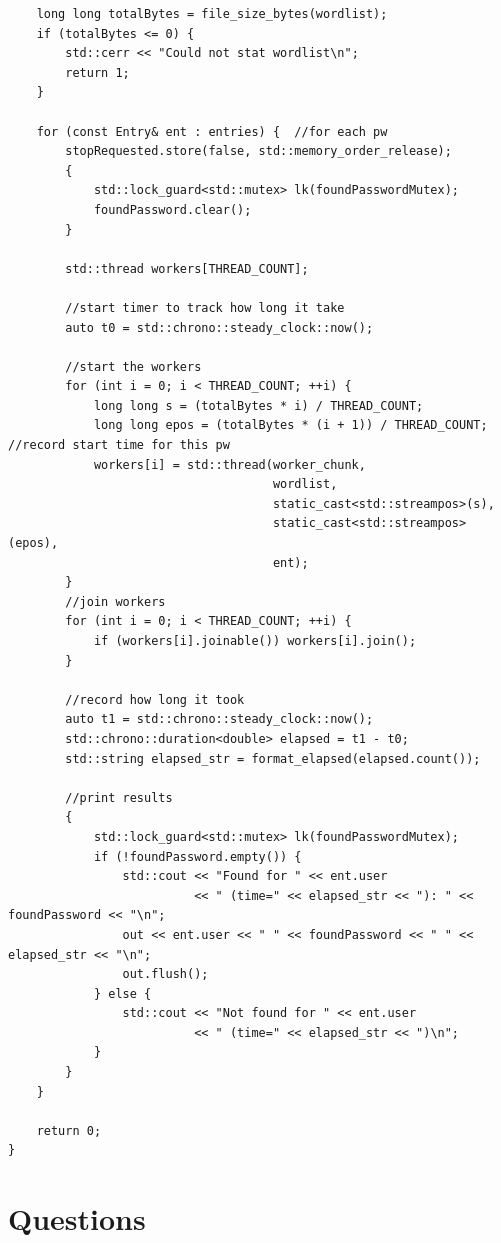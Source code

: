 \documentclass[11pt]{article}
\begin{document}
\begin{lstlisting}
    long long totalBytes = file_size_bytes(wordlist);
    if (totalBytes <= 0) {
        std::cerr << "Could not stat wordlist\n";
        return 1;
    }

    for (const Entry& ent : entries) {  //for each pw
        stopRequested.store(false, std::memory_order_release);
        {
            std::lock_guard<std::mutex> lk(foundPasswordMutex);
            foundPassword.clear();
        }

        std::thread workers[THREAD_COUNT];

        //start timer to track how long it take
        auto t0 = std::chrono::steady_clock::now();

        //start the workers
        for (int i = 0; i < THREAD_COUNT; ++i) {
            long long s = (totalBytes * i) / THREAD_COUNT;
            long long epos = (totalBytes * (i + 1)) / THREAD_COUNT; //record start time for this pw
            workers[i] = std::thread(worker_chunk,
                                     wordlist,
                                     static_cast<std::streampos>(s),
                                     static_cast<std::streampos>(epos),
                                     ent); 
        }
        //join workers
        for (int i = 0; i < THREAD_COUNT; ++i) {
            if (workers[i].joinable()) workers[i].join();
        }

        //record how long it took
        auto t1 = std::chrono::steady_clock::now();
        std::chrono::duration<double> elapsed = t1 - t0;
        std::string elapsed_str = format_elapsed(elapsed.count());

        //print results
        {
            std::lock_guard<std::mutex> lk(foundPasswordMutex);
            if (!foundPassword.empty()) {
                std::cout << "Found for " << ent.user
                          << " (time=" << elapsed_str << "): " << foundPassword << "\n";
                out << ent.user << " " << foundPassword << " " << elapsed_str << "\n";
                out.flush();
            } else {
                std::cout << "Not found for " << ent.user
                          << " (time=" << elapsed_str << ")\n";
            }
        }
    }

    return 0;
}
\end{lstlisting}



\section*{Questions}
\end{document}
